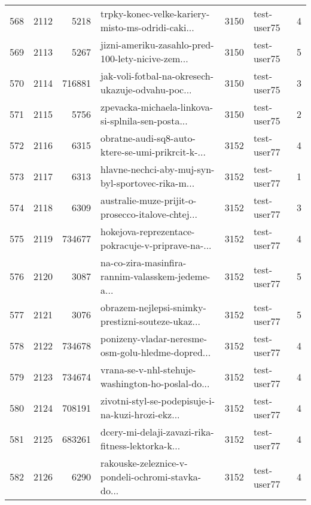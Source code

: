 \begin{tabular}{lrrlrlr}
568  &       2112 &     5218 &  trpky-konec-velke-kariery-misto-ms-odridi-caki... &     3150 &                  test-user75 &               4 \\
569  &       2113 &     5267 &  jizni-ameriku-zasahlo-pred-100-lety-nicive-zem... &     3150 &                  test-user75 &               5 \\
570  &       2114 &   716881 &  jak-voli-fotbal-na-okresech-ukazuje-odvahu-poc... &     3150 &                  test-user75 &               3 \\
571  &       2115 &     5756 &  zpevacka-michaela-linkova-si-splnila-sen-posta... &     3150 &                  test-user75 &               2 \\
572  &       2116 &     6315 &  obratne-audi-sq8-auto-ktere-se-umi-prikrcit-k-... &     3152 &                  test-user77 &               4 \\
573  &       2117 &     6313 &  hlavne-nechci-aby-muj-syn-byl-sportovec-rika-m... &     3152 &                  test-user77 &               1 \\
574  &       2118 &     6309 &  australie-muze-prijit-o-prosecco-italove-chtej... &     3152 &                  test-user77 &               3 \\
575  &       2119 &   734677 &  hokejova-reprezentace-pokracuje-v-priprave-na-... &     3152 &                  test-user77 &               4 \\
576  &       2120 &     3087 &  na-co-zira-masinfira-rannim-valasskem-jedeme-a... &     3152 &                  test-user77 &               5 \\
577  &       2121 &     3076 &  obrazem-nejlepsi-snimky-prestizni-souteze-ukaz... &     3152 &                  test-user77 &               5 \\
578  &       2122 &   734678 &  ponizeny-vladar-neresme-osm-golu-hledme-dopred... &     3152 &                  test-user77 &               4 \\
579  &       2123 &   734674 &  vrana-se-v-nhl-stehuje-washington-ho-poslal-do... &     3152 &                  test-user77 &               4 \\
580  &       2124 &   708191 &  zivotni-styl-se-podepisuje-i-na-kuzi-hrozi-ekz... &     3152 &                  test-user77 &               4 \\
581  &       2125 &   683261 &  dcery-mi-delaji-zavazi-rika-fitness-lektorka-k... &     3152 &                  test-user77 &               4 \\
582  &       2126 &     6290 &  rakouske-zeleznice-v-pondeli-ochromi-stavka-do... &     3152 &                  test-user77 &               4 \\

\end{tabular}
